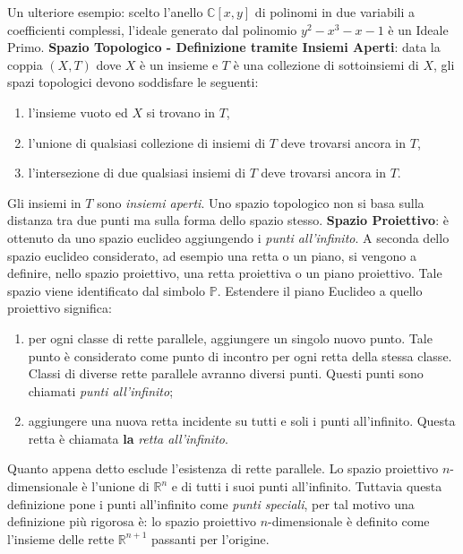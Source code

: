 \documentclass[a4paper,12pt]{tesiinfo}
\begin{document}
Un ulteriore esempio: scelto l'anello $\mathbb{C}[x, y]$ di polinomi in due variabili a coefficienti complessi, l'ideale generato dal polinomio $y^2 - x^3 -x -1$ \`e un Ideale Primo.
\newline\newline
%
%
%
\textbf{Spazio Topologico - Definizione tramite Insiemi Aperti}: data la coppia $(X, T)$ dove $X$ \`e un insieme e $T$ \`e una collezione di sottoinsiemi di $X$, gli spazi topologici devono soddisfare le seguenti:
\begin{enumerate}
    \item l'insieme vuoto ed $X$ si trovano in $T$,
    \item l'unione di qualsiasi collezione di insiemi di $T$ deve trovarsi ancora in $T$,
    \item l'intersezione di due qualsiasi insiemi di $T$ deve trovarsi ancora in $T$.
\end{enumerate}
Gli insiemi in $T$ sono \textit{insiemi aperti}.
\newline
Uno spazio topologico non si basa sulla distanza tra due punti ma sulla forma dello spazio stesso.
\newline\newline
%
%
%
\textbf{Spazio Proiettivo}: \`e ottenuto da uno spazio euclideo aggiungendo i \textit{punti all'infinito}. A seconda dello spazio euclideo considerato, ad esempio una retta o un piano, si vengono a definire, nello spazio proiettivo, una retta proiettiva o un piano proiettivo. Tale spazio viene identificato dal simbolo $\mathbb{P}$.
\newline
Estendere il piano Euclideo a quello proiettivo significa:
\begin{enumerate}
    \item per ogni classe di rette parallele, aggiungere un singolo nuovo punto. Tale punto \`e considerato come punto di incontro per ogni retta della stessa classe. Classi di diverse rette parallele avranno diversi punti. Questi punti sono chiamati \textit{punti all'infinito};
    \item aggiungere una nuova retta incidente su tutti e soli i punti all'infinito. Questa retta \`e chiamata \textbf{la} \textit{retta all'infinito}.
\end{enumerate}
Quanto appena detto esclude l'esistenza di rette parallele.
\newline
Lo spazio proiettivo $n$-dimensionale \`e l'unione di $\mathbb{R}^n$ e di tutti i suoi punti all'infinito. Tuttavia questa definizione pone i punti all'infinito come \textit{punti speciali}, per tal motivo una definizione pi\`u rigorosa \`e: lo spazio proiettivo $n$-dimensionale \`e definito come l'insieme delle rette $\mathbb{R}^ {n+1}$ passanti per l'origine.
\end{document}
